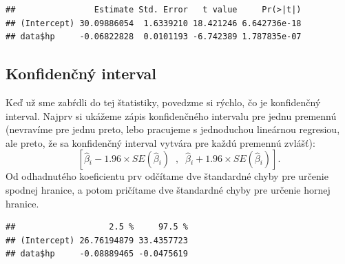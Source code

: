 \begin{Shaded}
\begin{Highlighting}[]

\OperatorTok{$}
\end{Highlighting}
\end{Shaded}

\begin{verbatim}
##                Estimate Std. Error   t value     Pr(>|t|)
## (Intercept) 30.09886054  1.6339210 18.421246 6.642736e-18
## data$hp     -0.06822828  0.0101193 -6.742389 1.787835e-07
\end{verbatim}

\hypertarget{konfidenux10dnuxfd-interval}{%
\subsection{Konfidenčný interval}\label{konfidenux10dnuxfd-interval}}

Keď už sme zabŕdli do tej štatistiky, povedzme si rýchlo, čo je
konfidenčný interval. Najprv si ukážeme zápis konfidenčného intervalu
pre jednu premennú (nevravíme pre jednu preto, lebo pracujeme s
jednoduchou lineárnou regresiou, ale preto, že sa konfidenčný interval
vytvára pre každú premennú zvlášť):
\[[\hat\beta{}_i - 1.96 × SE(\hat\beta{}_i)\;\;,\;\;\hat\beta{}_i + 1.96 × SE(\hat\beta{}_i)].\]
Od odhadnutého koeficientu prv odčítame dve štandardné chyby pre určenie
spodnej hranice, a potom pričítame dve štandardné chyby pre určenie
hornej hranice.

\begin{Shaded}
\begin{Highlighting}[]

\end{Highlighting}
\end{Shaded}

\begin{verbatim}
##                   2.5 %     97.5 %
## (Intercept) 26.76194879 33.4357723
## data$hp     -0.08889465 -0.0475619
\end{verbatim}

